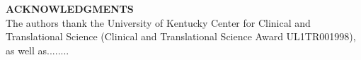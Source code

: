 \documentclass{amia}
\begin{document}

\textbf{ACKNOWLEDGMENTS}\\
The authors thank the University of Kentucky Center for Clinical and Translational Science (Clinical and Translational Science Award UL1TR001998), as well as........

\makeatletter
\renewcommand{\@biblabel}[1]{\hfill #1.}
\makeatother



{\footnotesize

\begin{thebibliography}{1}
\setlength\itemsep{-0.1em}


\end{thebibliography}}
\end{document}
